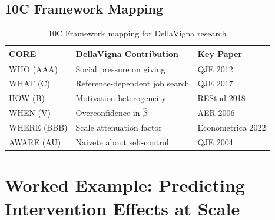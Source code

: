 \subsection{10C Framework Mapping}

\begin{table}[h]
\centering
\begin{tabular}{lll}
\hline
\textbf{CORE} & \textbf{DellaVigna Contribution} & \textbf{Key Paper} \\
\hline
WHO (AAA) & Social pressure on giving & QJE 2012 \\
WHAT (C) & Reference-dependent job search & QJE 2017 \\
HOW (B) & Motivation heterogeneity & REStud 2018 \\
WHEN (V) & Overconfidence in $\hat{\beta}$ & AER 2006 \\
WHERE (BBB) & Scale attenuation factor & Econometrica 2022 \\
AWARE (AU) & Naivete about self-control & QJE 2004 \\
\hline
\end{tabular}
\caption{10C Framework mapping for DellaVigna research}
\end{table}

\section{Worked Example: Predicting Intervention Effects at Scale}

